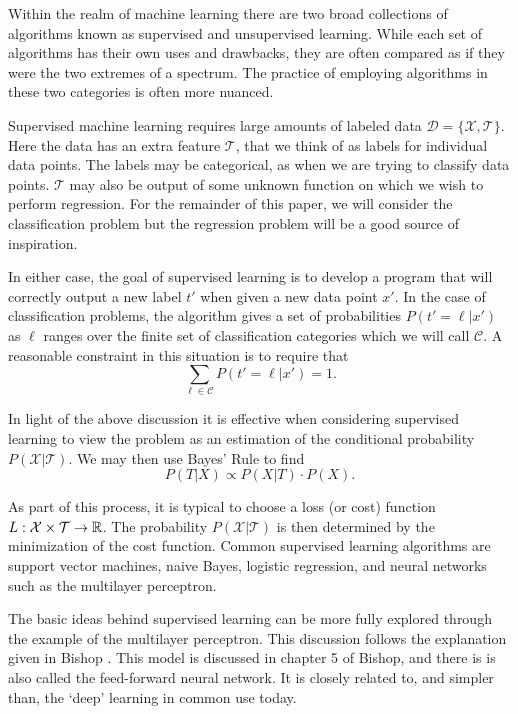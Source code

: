 \label{supVunsup}
Within the realm of machine learning there are two broad collections of 
algorithms known as supervised and unsupervised learning. While each set of 
algorithms has their own uses and drawbacks, they are often compared as if 
they were the two extremes of a spectrum. The practice of employing algorithms 
in these two categories is often more nuanced.

Supervised machine learning requires large amounts of labeled data 
$\mathcal{D}=\{\mathcal{X},\mathcal{T}\}$.  Here the data has an extra feature 
$\mathcal{T}$, that we think of as labels for individual data points.  The 
labels may be categorical, as when we are trying to classify data points.  
$\mathcal{T}$ may also be output of some unknown function on which we wish to 
perform regression. For the remainder of this paper, we will consider the 
classification problem but the regression problem will be a good source of 
inspiration.

In either case, the goal of supervised learning is to develop a program that
will correctly output a new label $t'$ when given a new data point $x'$. 
In the case of classification problems, the algorithm gives a set of 
probabilities $P(t'=\ell|x')$ as $\ell$ ranges over the finite set of 
classification categories which we will call $\mathcal{C}$. A reasonable 
constraint in this situation is to require that 
\[\sum_{\ell\in\mathcal{C}}P(t'=\ell|x') = 1.\]

In light of the above discussion it is effective when considering supervised 
learning to view the problem as an estimation of the conditional probability 
$P(\mathcal{X}|\mathcal{T})$. We may then use Bayes' Rule to find 
\[P(T|X)\propto P(X|T)\cdot P(X).\]

As part of this process, it is typical to choose a loss (or cost) function 
$L:\mathcal{X}\times\mathcal{T}\rightarrow \mathbb R$.  The probability 
$P(\mathcal{X}|\mathcal{T})$ is then determined by the minimization of the 
cost function. Common supervised learning algorithms are support vector 
machines, naive Bayes, logistic regression, and  neural networks such as the multilayer perceptron.

The basic ideas behind supervised learning can be more fully explored through 
the example of the multilayer perceptron.  This discussion follows the explanation given in 
Bishop \cite{BishopBook}. This model is discussed in chapter 5 of Bishop, 
and there is is also called the feed-forward neural network. It is closely 
related to, and simpler than, the `deep' learning in common use today.

